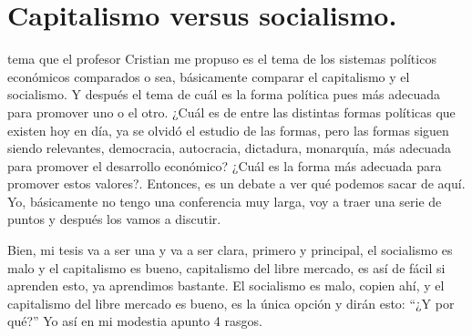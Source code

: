\chapter{Capitalismo versus socialismo.}

{}
{}%


 tema que el profesor Cristian me propuso es el tema de los sistemas políticos económicos comparados o sea, básicamente comparar el capitalismo y el socialismo. Y después el tema de cuál es la forma política pues más adecuada para promover uno o el otro. ¿Cuál es de entre las distintas formas políticas que existen hoy en día, ya se olvidó el estudio de las formas, pero las formas siguen siendo relevantes, democracia, autocracia, dictadura, monarquía, más adecuada para promover el desarrollo económico? ¿Cuál es la forma más adecuada para promover estos valores?. Entonces, es un debate a ver qué podemos sacar de aquí. Yo, básicamente no tengo una conferencia muy larga, voy a traer una serie de puntos y después los vamos a discutir.

Bien, mi tesis va a ser una y va a ser clara, primero y principal, el socialismo es malo y el capitalismo es bueno, capitalismo del libre mercado, es así de fácil si aprenden esto, ya aprendimos bastante. El socialismo es malo, copien ahí, y el capitalismo del libre mercado es bueno, es la única opción y dirán esto: \enquote{¿Y por qué?} Yo así en mi modestia apunto 4 rasgos.

